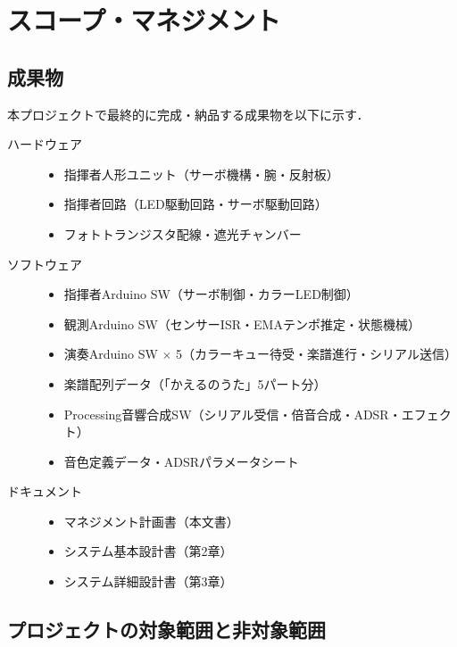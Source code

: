 \section{スコープ・マネジメント}\label{sec:scope}

\subsection{成果物}

本プロジェクトで最終的に完成・納品する成果物を以下に示す．

\begin{description}
  \item[ハードウェア]
    \begin{itemize}
      \item 指揮者人形ユニット（サーボ機構・腕・反射板）
      \item 指揮者回路（LED駆動回路・サーボ駆動回路）
      \item フォトトランジスタ配線・遮光チャンバー
    \end{itemize}
  \item[ソフトウェア]
    \begin{itemize}
      \item 指揮者Arduino SW（サーボ制御・カラーLED制御）
      \item 観測Arduino SW（センサーISR・EMAテンポ推定・状態機械）
      \item 演奏Arduino SW $\times$ 5（カラーキュー待受・楽譜進行・シリアル送信）
      \item 楽譜配列データ（「かえるのうた」5パート分）
      \item Processing音響合成SW（シリアル受信・倍音合成・ADSR・エフェクト）
      \item 音色定義データ・ADSRパラメータシート
    \end{itemize}
  \item[ドキュメント]
    \begin{itemize}
      \item マネジメント計画書（本文書）
      \item システム基本設計書（第2章）
      \item システム詳細設計書（第3章）
    \end{itemize}
\end{description}

\subsection{プロジェクトの対象範囲と非対象範囲}

